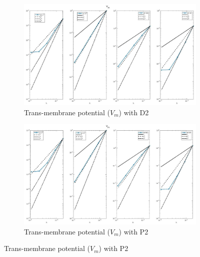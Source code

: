 \documentclass[a4paper,11pt]{article}
\begin{document}
\begin{figure}[H]
\caption{Comparison of the trans-membrane potential ($V_m$)}
\label{Vm_2}
\begin{subfigure}{\textwidth}
\begin{center}
\includegraphics[width = \textwidth]{./D2_Vm_1.jpg}
\caption{Trans-membrane potential  ($V_m$) with D2}
\end{center}
\end{subfigure}
\begin{subfigure}{\textwidth}
\begin{center}
\includegraphics[width =\textwidth]{./P2_Vm_1.jpg}
\caption{Trans-membrane potential  ($V_m$) with P2}
\end{center}
\end{subfigure}
\end{figure}
\end{document}
